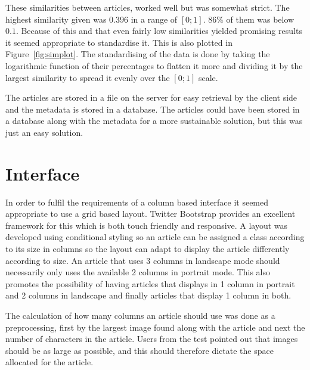 These similarities between articles, worked well but was somewhat strict. The highest similarity given was $0.396$ in a range of $[0;1]$. $86\%$ of them was below $0.1$. Because of this and that even fairly low similarities yielded promising results it seemed appropriate to standardise it. This is also plotted in Figure~\ref{fig:simplot}. The standardising of the data is done by taking the logarithmic function of their percentages to flatten it more and dividing it by the largest similarity to spread it evenly over the $[0;1]$ scale.

The articles are stored in a file on the server for easy retrieval by the client side and the metadata is stored in a database. The articles could have been stored in a database along with the metadata for a more sustainable solution, but this was just an easy solution.

\section{Interface}
In order to fulfil the requirements of a column based interface it seemed appropriate to use a grid based layout. Twitter Bootstrap provides an excellent framework for this which is both touch friendly and responsive. A layout was developed using conditional styling so an article can be assigned a class according to its size in columns so the layout can adapt to display the article differently according to size. An article that uses 3 columns in landscape mode should necessarily only uses the available 2 columns in portrait mode. This also promotes the possibility of having articles that displays in 1 column in portrait and 2 columns in landscape and finally articles that display 1 column in both.

The calculation of how many columns an article should use was done as a preprocessing, first by the largest image found along with the article and next the number of characters in the article. Users from the test pointed out that images should be as large as possible, and this should therefore dictate the space allocated for the article.

